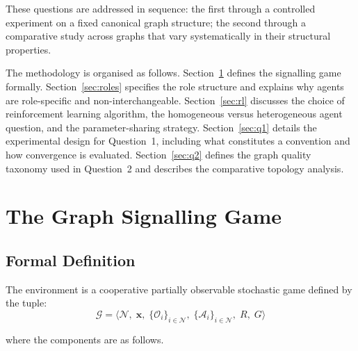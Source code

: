 \documentclass[a4paper,twoside,12pt]{report}
\begin{document}
    These questions are addressed in sequence: the first through a controlled
    experiment on a fixed canonical graph structure; the second through a
    comparative study across graphs that vary systematically in their structural
    properties.
    
    The methodology is organised as follows. Section~\ref{sec:game} defines the
    signalling game formally. Section~\ref{sec:roles} specifies the role structure
    and explains why agents are role-specific and non-interchangeable.
    Section~\ref{sec:rl} discusses the choice of reinforcement learning algorithm,
    the homogeneous versus heterogeneous agent question, and the parameter-sharing
    strategy. Section~\ref{sec:q1} details the experimental design for Question~1,
    including what constitutes a convention and how convergence is evaluated.
    Section~\ref{sec:q2} defines the graph quality taxonomy used in Question~2 and
    describes the comparative topology analysis.
    
    
    \section{The Graph Signalling Game}
    \label{sec:game}
    
    \subsection{Formal Definition}
    
    The environment is a cooperative partially observable stochastic game defined by the tuple:
    \begin{equation}
        \mathcal{G} = \langle \mathcal{N},\;
        \mathbf{x},\;
        \{\mathcal{O}_i\}_{i \in \mathcal{N}},\;
        \{\mathcal{A}_i\}_{i \in \mathcal{N}},\;
        R,\;
        G \rangle
    \end{equation}
    
    \noindent where the components are as follows.
    
\end{document}
